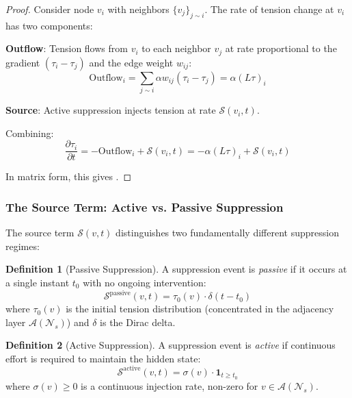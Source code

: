 \documentclass[12pt,a4paper]{article}
\theoremstyle{definition}
\newtheorem{definition}{Definition}[section]
\theoremstyle{remark}
\newcommand{\NS}{\mathcal{N}_s}          %
\newcommand{\CA}{\mathcal{A}}            %
\begin{document}
\begin{proof}
Consider node $v_i$ with neighbors $\{v_j\}_{j \sim i}$. The rate of tension change at $v_i$ has two components:

\textbf{Outflow}: Tension flows from $v_i$ to each neighbor $v_j$ at rate proportional to the gradient $(\tau_i - \tau_j)$ and the edge weight $w_{ij}$:
\begin{equation}
    \text{Outflow}_i = \sum_{j \sim i} \alpha w_{ij} (\tau_i - \tau_j) = \alpha (L\tau)_i
\end{equation}

\textbf{Source}: Active suppression injects tension at rate $\mathcal{S}(v_i, t)$.

Combining:
\begin{equation}
    \frac{\partial \tau_i}{\partial t} = -\text{Outflow}_i + \mathcal{S}(v_i, t) = -\alpha (L\tau)_i + \mathcal{S}(v_i, t)
\end{equation}

In matrix form, this gives .
\end{proof}

\subsubsection{The Source Term: Active vs. Passive Suppression}

The source term $\mathcal{S}(v, t)$ distinguishes two fundamentally different suppression regimes:

\begin{definition}[Passive Suppression]
A suppression event is \emph{passive} if it occurs at a single instant $t_0$ with no ongoing intervention:
\begin{equation}
    \mathcal{S}^{\text{passive}}(v, t) = \tau_0(v) \cdot \delta(t - t_0)
\end{equation}
where $\tau_0(v)$ is the initial tension distribution (concentrated in the adjacency layer $\CA(\NS)$) and $\delta$ is the Dirac delta.
\end{definition}

\begin{definition}[Active Suppression]
A suppression event is \emph{active} if continuous effort is required to maintain the hidden state:
\begin{equation}
    \mathcal{S}^{\text{active}}(v, t) = \sigma(v) \cdot \mathbf{1}_{t \geq t_0}
\end{equation}
where $\sigma(v) \geq 0$ is a continuous injection rate, non-zero for $v \in \CA(\NS)$.
\end{definition}
\end{document}
